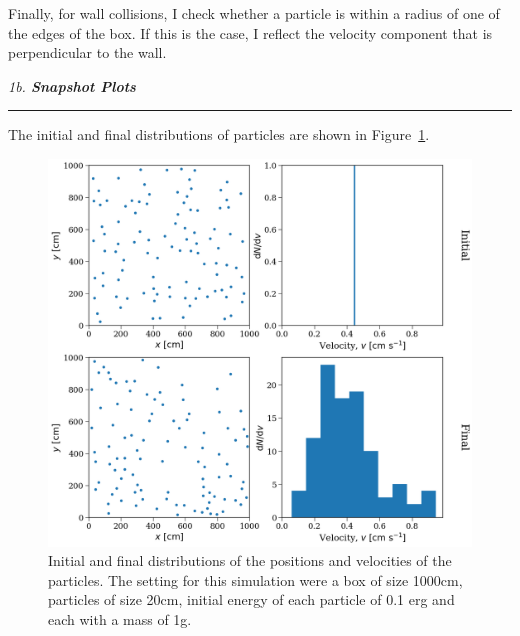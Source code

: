 \documentclass[12pt, letterpaper, twoside]{article}
\newcommand{\question}[1]{{\noindent \it #1}}
\newcommand{\answer}[1]{
    \par\noindent\rule{\textwidth}{0.4pt}#1\vspace{0.5cm}
}
\begin{document}
{    Finally, for wall collisions, I check whether a particle is within a radius of one of the edges of the box. If this is the case, I reflect the velocity component that is perpendicular to the wall.
}

\pagebreak

\question{1b. \textbf{Snapshot Plots}}
\answer{
    The initial and final distributions of particles are shown in Figure~\ref{fig:1b}.
    \begin{figure}[htbp]
        \centering
        \includegraphics[width=\textwidth]{figures/1b.png}
        \caption{Initial and final distributions of the positions and velocities of the particles. The setting for this simulation were a box of size 1000cm, particles of size 20cm, initial energy of each particle of 0.1 erg and each with a mass of 1g.}
        \label{fig:1b}
    \end{figure}
}

\pagebreak
\end{document}
